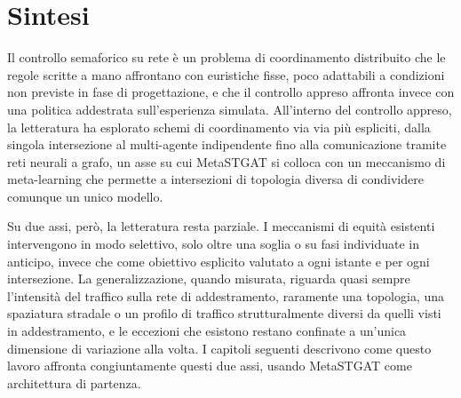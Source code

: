 \section{Sintesi}

Il controllo semaforico su rete è un problema di coordinamento
distribuito che le regole scritte a mano affrontano con euristiche fisse,
poco adattabili a condizioni non previste in fase di progettazione, e che
il controllo appreso affronta invece con una politica addestrata
sull'esperienza simulata. All'interno del controllo appreso, la
letteratura ha esplorato schemi di coordinamento via via più espliciti,
dalla singola intersezione al multi-agente indipendente fino alla
comunicazione tramite reti neurali a grafo, un asse su cui MetaSTGAT si
colloca con un meccanismo di meta-learning che permette a intersezioni di
topologia diversa di condividere comunque un unico modello.

Su due assi, però, la letteratura resta parziale. I meccanismi di equità
esistenti intervengono in modo selettivo, solo oltre una soglia o su fasi
individuate in anticipo, invece che come obiettivo esplicito valutato a
ogni istante e per ogni intersezione. La generalizzazione, quando
misurata, riguarda quasi sempre l'intensità del traffico sulla rete di
addestramento, raramente una topologia, una spaziatura stradale o un
profilo di traffico strutturalmente diversi da quelli visti in
addestramento, e le eccezioni che esistono restano confinate a un'unica
dimensione di variazione alla volta. I capitoli seguenti descrivono come
questo lavoro affronta congiuntamente questi due assi, usando MetaSTGAT
come architettura di partenza.
